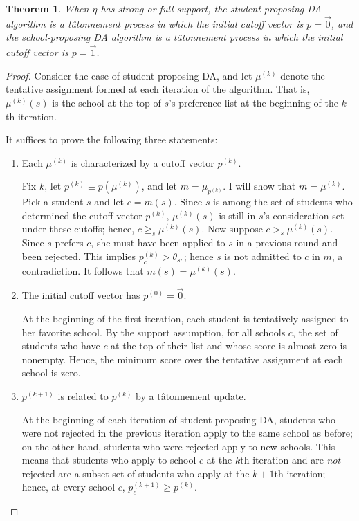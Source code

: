 \documentclass[12pt]{article}
\newtheorem{theorem}{Theorem}
\theoremstyle{definition}
\begin{document}
\begin{theorem}When $\eta$ has strong or full support, the student-proposing DA algorithm is a t\^{a}tonnement process in which the initial cutoff vector is $p = \vec 0$, and the school-proposing DA algorithm is a t\^{a}tonnement process in which the initial cutoff vector is $p = \vec 1$. \end{theorem}
\begin{proof}
Consider the case of student-proposing DA, and let $\mu^{(k)}$ denote the tentative assignment formed at each iteration of the algorithm. That is, $\mu^{(k)}(s)$ is the school at the top of $s$’s preference list at the beginning of the $k$th iteration.

It suffices to prove the following three statements:
\begin{enumerate}
\item Each $\mu^{(k)}$ is characterized by a cutoff vector $p^{(k)}$.

Fix $k$, let $p^{(k)} \equiv p\left(\mu^{(k)}\right)$, and let $m = \mu_{p^{(k)}}$. I will show that $m = \mu^{(k)}$. Pick a student $s$ and let $c = m(s)$. Since $s$ is among the set of students who determined the cutoff vector $p^{(k)}$, $ \mu^{(k)}(s)$ is still in $s$’s consideration set under these cutoffs; hence,  $c \geq_s \mu^{(k)}(s)$.  Now suppose $c >_s \mu^{(k)}(s)$. Since $s$ prefers $c$, she must have been applied to $s$ in a previous round and been rejected. This implies $p^{(k)}_{c} > \theta_{sc}$; hence $s$ is not admitted to $c$ in $m$, a contradiction. It follows that $m(s) = \mu^{(k)}(s)$. 

\item The initial cutoff vector has $p^{(0)} = \vec 0$.

At the beginning of the first iteration, each student is tentatively assigned to her favorite school. By the support assumption, for all schools $c$, the set of students who have $c$ at the top of their list and whose score is almost zero is nonempty. Hence, the minimum score over the tentative assignment at each school is zero.

\item $p^{(k+1)}$ is related to $p^{(k)}$ by a t\^{a}tonnement update.

At the beginning of each iteration of student-proposing DA, students who were not rejected in the previous iteration apply to the same school as before; on the other hand, students who were rejected apply to new schools. This means that students who apply to school $c$ at the $k$th iteration and are \emph{not} rejected are a subset set of students who apply at the $k+1$th iteration; hence, at every school $c$, $p_c^{(k+1)} \geq p^{(k)}$.


\end{enumerate}
\end{proof}
\end{document}
